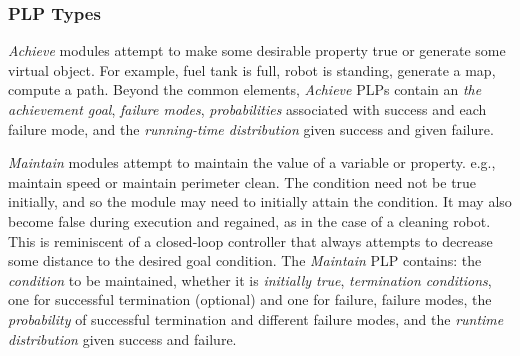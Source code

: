\documentclass[letterpaper]{article}
\begin{document}
\subsubsection{PLP Types}


{\em Achieve\/} modules attempt to make some desirable property true or  generate some virtual object. For example,
fuel tank is full, robot is standing, generate a map, compute a path.
Beyond the common elements, {\em Achieve} PLPs contain an \textit{the achievement goal}, 
\textit{failure modes}, \textit{probabilities} associated with
success and each failure mode, and the \textit{running-time distribution} given success and given failure. 


{\em Maintain\/} modules attempt to maintain the value of a variable or 
property.
e.g., maintain speed or maintain perimeter clean. The condition need not be true initially, 
and so the module may need to initially attain the condition. It may also become false during execution and regained, as in the case of a cleaning robot. This is reminiscent of a closed-loop controller that always attempts to decrease some distance to the desired goal condition. 
%
The {\em Maintain} PLP contains: the \textit{condition} to be maintained,
whether it is \textit{initially true}, \textit{termination conditions}, one for successful termination (optional) and one for failure,
failure modes, the \textit{probability} of successful termination and different failure modes, and the \textit{runtime distribution} given success and failure. 
\end{document}
